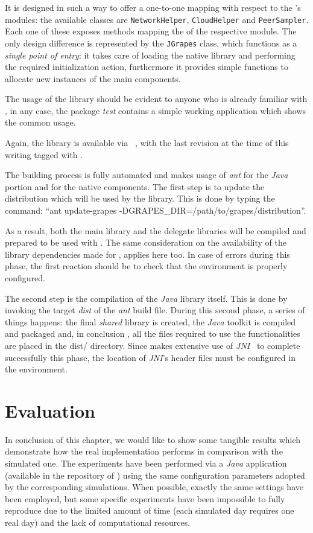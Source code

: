 It is designed in such a way to offer a one-to-one mapping with respect
to the \grapes's modules: the available classes are
\texttt{NetworkHelper}, \texttt{CloudHelper} and
\texttt{PeerSampler}. Each one of these exposes methods mapping the
\api of the respective \grapes module. The only design difference is
represented by the \texttt{JGrapes} class, which functions as a
\textit{single point of entry}: it takes care of loading the native
library and performing the required initialization action, furthermore it
provides simple functions to allocate new instances of the main
components.

The usage of the library should be evident to anyone who is already
familiar with \grapes, in any case, the package \emph{test} contains
a simple working application which shows the common usage.

Again, the library is available via \github~\cite{jGRAPES-repo}, with
the last revision at the time of this writing tagged with
\thesistag.

The building process is fully automated and makes usage of \emph{ant}
for the \emph{Java} portion and \make for the native components. The
first step is to update the \grapes distribution which will be used by
the library.
This is done by typing the command: ``ant update-grapes
-DGRAPES\_DIR=/path/to/grapes/distribution''.

As a result, both the
main \grapes library and the \cloudhelper delegate libraries will be
compiled and prepared to be used with \jgrapes. The same consideration
on the availability of the library dependencies made for
\grapes, applies here too. In case of errors during this phase, the
first reaction should be to check that the environment is properly
configured.

The second step is the compilation of the \emph{Java} library
itself. This is done by invoking the target \textit{dist} of the
\emph{ant} build file. During this second phase, a series of things
happens: the final \emph{shared} library is created, the \textit{Java}
toolkit is compiled and packaged and, in conclusion , all the files
required to use the functionalities are placed in the \textsf{dist/}
directory.
Since \jgrapes makes extensive use of \emph{JNI}~\cite{JNIGuide} to
complete successfully this phase, the location of \emph{JNI}'s header
files must be configured in the environment.

\section{Evaluation}
In conclusion of this chapter, we would like to show some tangible
results which demonstrate how the real implementation performs in
comparison with the simulated one.
The experiments have been performed via a \emph{Java} application
(available in the repository of \jgrapes) using the same configuration
parameters adopted by the corresponding simulations. When possible,
exactly the same settings have been employed,
but some specific experiments have been impossible to fully reproduce due to
the limited amount of time (each simulated day requires one real day)
and the lack of computational resources.

